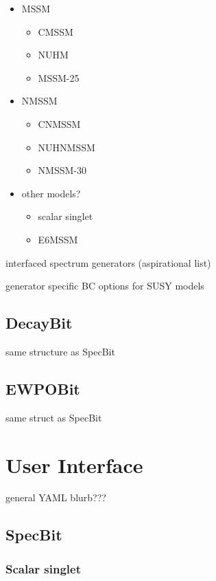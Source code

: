 \documentclass[11pt,a4paper]{article}
\begin{document}
\begin{itemize} 
\item MSSM
  \begin{itemize}
  \item CMSSM 
  \item NUHM 
  \item MSSM-25
  \end{itemize} 
\item NMSSM
  \begin{itemize}
  \item CNMSSM  
  \item NUHNMSSM 
  \item NMSSM-30
  \end{itemize}
\item other models?
  \begin{itemize}
  \item scalar singlet
  \item E6MSSM  
  \end{itemize}
\end{itemize}  

interfaced spectrum generators (aspirational list)
         
generator specific BC options for SUSY models

\subsection{DecayBit}

same structure as SpecBit

\subsection{EWPOBit}

same struct as SpecBit


\section{User Interface}

general YAML blurb???

\subsection{SpecBit}

\subsubsection{Scalar singlet}
\end{document}
